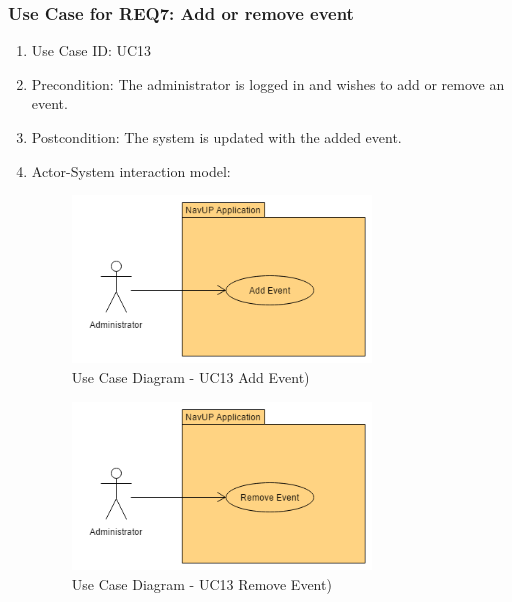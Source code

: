 \documentclass[11pt, a4paper]{article}
\begin{document}
		\subsubsection{Use Case for REQ7: Add or remove event}
			\begin{enumerate}
			\renewcommand{\labelenumi}{{\textbf{\arabic{enumi}.}}}
			\item Use Case ID: UC13
			\item Precondition: The administrator is logged in and wishes to add or remove an event.
			\item Postcondition: The system is updated with the added event.
			\item Actor-System interaction model:
				\graphicspath{ {./Images/Administrator/} }
				\begin{figure}[h]
				\caption{Use Case Diagram - UC13 Add Event)}
				\includegraphics[width = 300px]{AddEvent.png}
				\end{figure}
		
				\graphicspath{ {./Images/Administrator/} }
				\begin{figure}[h]
				\caption{Use Case Diagram - UC13 Remove Event)}
				\includegraphics[width = 300px]{RemoveEvent.png}
				\end{figure}
			\end{enumerate}
\end{document}
